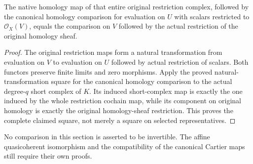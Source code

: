 \begin{proposition}
\label{prop:scheme-original-section-homology-restriction}
\leanok
{}
The native homology map of that entire original restriction
complex, followed by the canonical homology comparison for
evaluation on $U$ with scalars restricted to
$\mathcal O_X(V)$, equals the comparison on $V$ followed by
the actual restriction of the original homology sheaf.
\end{proposition}
\begin{proof}
The original restriction maps form a natural transformation
from evaluation on $V$ to evaluation on $U$ followed by actual
restriction of scalars. Both functors preserve finite limits
and zero morphisms. Apply the proved natural-transformation
square for the canonical homology comparison to the actual
degree-$q$ short complex of $K$. Its induced short-complex map
is exactly the one induced by the whole restriction cochain
map, while its component on original homology is exactly the
original homology-sheaf restriction. This proves the complete
claimed square, not merely a square on selected representatives.
\end{proof}

No comparison in this section is asserted to be invertible.
The affine quasicoherent isomorphism and the compatibility of
the canonical Cartier maps still require their own proofs.
